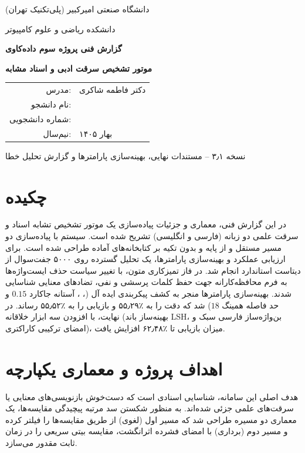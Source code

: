 \documentclass[12pt,onecolumn,a4paper]{article}
\begin{document}
\begin{titlepage}
\centering
\vspace*{1.5cm}
{\Large دانشگاه صنعتی امیرکبیر (پلی‌تکنیک تهران)\par}
\vspace{0.5cm}
{\large دانشکده ریاضی و علوم کامپیوتر\par}
\vspace{1.8cm}
{\Huge\bfseries گزارش فنی پروژه سوم داده‌کاوی\par}
\vspace{0.5cm}
{\LARGE\bfseries موتور تشخیص سرقت ادبی و اسناد مشابه\par}
\vspace{0.3cm}
{\Large{}\par}
\vfill
\begin{tabular}{rl}
مدرس: & دکتر فاطمه شاکری\\[4pt]
نام دانشجو: & \dotfill\\[4pt]
شماره دانشجویی: & \dotfill\\[4pt]
نیم‌سال: & بهار ۱۴۰۵
\end{tabular}
\vfill
{\large نسخه ۳٫۱ -- مستندات نهایی، بهینه‌سازی پارامترها و گزارش تحلیل خطا\par}
\end{titlepage}

\tableofcontents
\newpage

\section{چکیده}
در این گزارش فنی، معماری و جزئیات پیاده‌سازی یک موتور تشخیص تشابه اسناد و سرقت علمی دو زبانه (فارسی و انگلیسی) تشریح شده است. سیستم با پیاده‌سازی دو مسیر مستقل  و  از پایه و بدون تکیه بر کتابخانه‌های آماده طراحی شده است. برای ارزیابی عملکرد و بهینه‌سازی پارامترها، یک تحلیل گسترده روی ۵۰۰۰ جفت‌سوال از دیتاست استاندارد  انجام شد. در فاز تمیزکاری متون، با تغییر سیاست حذف ایست‌واژه‌ها به فرم محافظه‌کارانه جهت حفظ کلمات پرسشی و نفی، تضادهای معنایی شناسایی شدند. بهینه‌سازی پارامترها منجر به کشف پیکربندی ایده آل (، ، آستانه جاکارد $0.15$ و حد فاصله همینگ $18$) شد که دقت را به ٪۵۵٫۲۹ و بازیابی را به ٪۵۵٫۵۲ رساند. در نهایت، با افزودن سه ابزار خلاقانه (بهینه‌ساز باند LSH، بن‌واژه‌ساز فارسی سبک و امضای ترکیبی کاراکتری)، میزان بازیابی تا ٪۶۲٫۴۸ افزایش یافت.

\section{اهداف پروژه و معماری یکپارچه}
هدف اصلی این سامانه، شناسایی اسنادی است که دست‌خوش بازنویسی‌های معنایی یا سرقت‌های علمی جزئی شده‌اند. به منظور شکستن سد مرتبه پیچیدگی مقایسه‌ها، یک معماری دو مسیره طراحی شد که مسیر اول (لغوی) از طریق  مقایسه‌ها را فیلتر کرده و مسیر دوم (برداری) با امضای فشرده اثرانگشت، مقایسه بیتی سریعی را در زمان ثابت مقدور می‌سازد.
\end{document}
